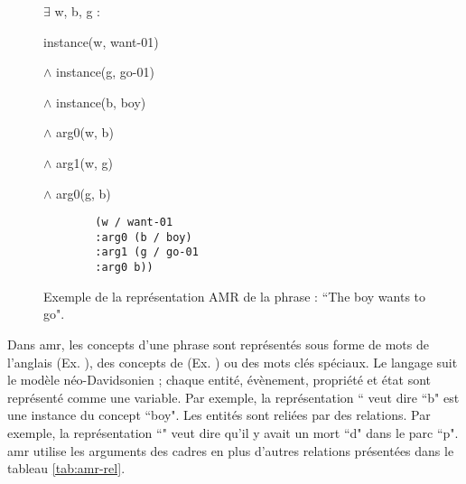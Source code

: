 \documentclass{KodeBook}
\begin{document}
\begin{figure}[ht]
	\centering
	\begin{minipage}{.3\textwidth}
		
		\footnotesize
		$ \exists $ w, b, g : 
		
		instance(w, want-01) 
		
		$ \wedge $ instance(g, go-01) 
		
		$ \wedge $ instance(b, boy) 
		
		$ \wedge $ arg0(w, b) 
		
		$ \wedge $ arg1(w, g) 
		
		$ \wedge $ arg0(g, b)
	\end{minipage}
	\begin{minipage}{.35\textwidth}
		
		\begin{verbatim}
		(w / want-01
		:arg0 (b / boy)
		:arg1 (g / go-01
		:arg0 b))
		\end{verbatim}
		
	\end{minipage}
	\begin{minipage}{.3\textwidth}
		
	\end{minipage}
	\caption[Exemple d'une représentation AMR.]{Exemple de la représentation AMR de la phrase : ``The boy wants to go".}
	\label{fig:amr-exp}
\end{figure}

Dans \ac{amr}, les concepts d'une phrase sont représentés sous forme de mots de l'anglais (Ex. ), des concepts de  (Ex. ) ou des mots clés spéciaux. 
Le langage suit le modèle néo-Davidsonien ; chaque entité, évènement, propriété et état sont représenté comme une variable. 
Par exemple, la représentation ``  veut dire ``b" est une instance du concept ``boy".
Les entités sont reliées par des relations.
Par exemple, la représentation ``" veut dire qu'il y avait un mort ``d" dans le parc ``p".
\ac{amr} utilise les arguments des cadres  en plus d'autres relations présentées dans le tableau \ref{tab:amr-rel}.
\end{document}
